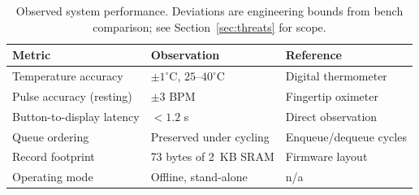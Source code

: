 \begin{table}[t]
  \caption{Observed system performance. Deviations are engineering bounds from
    bench comparison; see Section~\ref{sec:threats} for scope.}
  \label{tab:experimental_results_table}
  \small
  \begin{tabular}{@{}lll@{}}
    \toprule
    Metric & Observation & Reference \\
    \midrule
    Temperature accuracy      & $\pm 1^{\circ}$C, $25$--$40^{\circ}$C & Digital thermometer \\
    Pulse accuracy (resting)  & $\pm 3$ BPM                           & Fingertip oximeter \\
    Button-to-display latency & $< 1.2$ s                             & Direct observation \\
    Queue ordering            & Preserved under cycling               & Enqueue/dequeue cycles \\
    Record footprint          & 73 bytes of 2~KB SRAM                 & Firmware layout \\
    Operating mode            & Offline, stand-alone                  & n/a \\
    \bottomrule
  \end{tabular}
\end{table}
